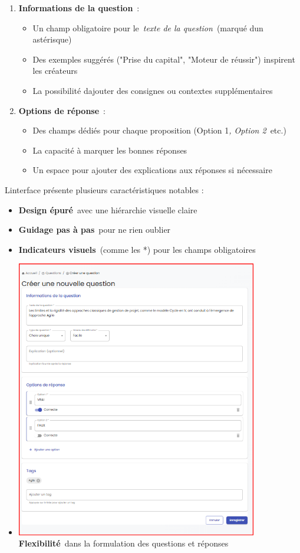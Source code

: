 \documentclass[12pt,a4paper,twoside,openright]{report}
\begin{document}
\begin{enumerate}
\def\labelenumi{\arabic{enumi}.}
\item
  \textbf{Informations de la question}~:

  \begin{itemize}
  \item
    Un champ obligatoire pour le~\emph{texte de la question}~(marqué
    d\textquotesingle un astérisque)
  \item
    Des exemples suggérés ("Prise du capital", "Moteur de réussir")
    inspirent les créateurs
  \item
    La possibilité d\textquotesingle ajouter des consignes ou contextes
    supplémentaires
  \end{itemize}
\item
  \textbf{Options de réponse}~:

  \begin{itemize}
  \item
    Des champs dédiés pour chaque proposition (Option 1\emph{, Option
    2}~etc.)
  \item
    La capacité à marquer les bonnes réponses
  \item
    Un espace pour ajouter des explications aux réponses si nécessaire
  \end{itemize}
\end{enumerate}

L\textquotesingle interface présente plusieurs caractéristiques notables
:

\begin{itemize}
\item
  \textbf{Design épuré}~avec une hiérarchie visuelle claire
\item
  \textbf{Guidage pas à pas}~pour ne rien oublier
\item
  \textbf{Indicateurs visuels}~(comme les *) pour les champs
  obligatoires
\item
  \includegraphics[width=4.15299in,height=4.78497in]{latex_media/media/image55.png}\textbf{Flexibilité}~dans
  la formulation des questions et réponses
\end{itemize}
\end{document}
